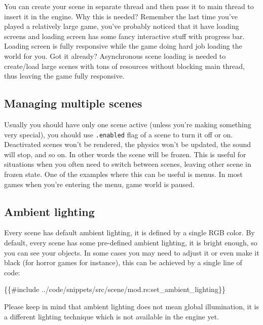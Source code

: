 \documentclass[
]{book}
\newenvironment{Shaded}{\begin{snugshade}}{\end{snugshade}}
\newcommand{\NormalTok}[1]{#1}
\theoremstyle{definition}
\theoremstyle{definition}
\theoremstyle{definition}
\theoremstyle{definition}
\theoremstyle{remark}
\begin{document}
You can create your scene in separate thread and then pass it to main thread to insert it in the engine. Why this is needed? Remember the last time you've played a relatively large game, you've probably noticed that it have loading screens and loading screen has some fancy interactive stuff with progress bar. Loading screen is fully responsive while the game doing hard job loading the world for you. Got it already? Asynchronous scene loading is needed to create/load large scenes with tons of resources without blocking main thread, thus leaving the game fully responsive.

\subsection{Managing multiple scenes}\label{managing-multiple-scenes}

Usually you should have only one scene active (unless you're making something very special), you should use \texttt{.enabled} flag of a scene to turn it off or on. Deactivated scenes won't be rendered, the physics won't be updated, the sound will stop, and so on. In other words the scene will be frozen. This is useful for situations when you often need to switch between scenes, leaving other scene in frozen state. One of the examples where this can be useful is menus. In most games when you're entering the menu, game world is paused.

\subsection{Ambient lighting}\label{ambient-lighting}

Every scene has default ambient lighting, it is defined by a single RGB color. By default, every scene has some pre-defined ambient lighting, it is bright enough, so you can see your objects. In some cases you may need to adjust it or even make it black (for horror games for instance), this can be achieved by a single line of code:

\begin{Shaded}
\begin{Highlighting}[]
\NormalTok{\{\{\#include ../code/snippets/src/scene/mod.rs:set\_ambient\_lighting\}\}}
\end{Highlighting}
\end{Shaded}

Please keep in mind that ambient lighting does not mean global illumination, it is a different lighting technique which is not available in the engine yet.
\end{document}
